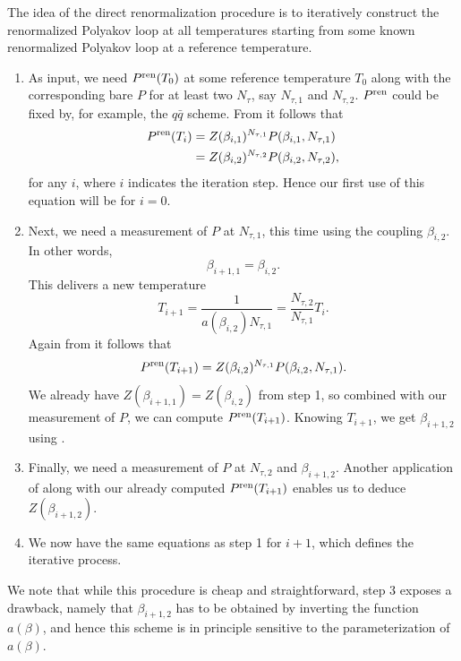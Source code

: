 The idea of the direct renormalization procedure is
to iteratively construct the renormalized Polyakov loop at all temperatures
starting from some known renormalized Polyakov loop at a reference temperature.
\begin{enumerate}
  \item As input, we need $P^{\rm ren}(T_0)$ at some reference temperature
  $T_0$ along with the corresponding bare $P$ for at least two $N_\tau$, 
  say $N_{\tau,1}$ and $N_{\tau,2}$. $P^{\rm ren}$ could be fixed by, for example, 
  the $q\bar{q}$ scheme. From  it follows that
  \begin{equation*}\begin{aligned}
  P^{\rm ren}(T_i)&=Z(\beta_{i,1})^{N_{\tau,1}}P(\beta_{i,1},N_{\tau,1})\\
            &=Z(\beta_{i,2})^{N_{\tau,2}}P(\beta_{i,2},N_{\tau,2}),
  \end{aligned}\end{equation*}
  for any $i$, where $i$ indicates the iteration step. Hence our first use
  of this equation will be for $i=0$.
  \item Next, we need a measurement of $P$ at $N_{\tau,1}$, this time using the
  coupling $\beta_{i,2}$. In other words,
  $$
  \beta_{i+1,1}=\beta_{i,2}.
  $$
  This delivers a new temperature
  $$
  T_{i+1}=\frac{1}{a(\beta_{i,2})N_{\tau,1}}=\frac{N_{\tau,2}}{N_{\tau,1}}T_i.
  $$
  Again from  it follows that
  $$
  P^{\rm ren}(T_{i+1})=Z(\beta_{i,2})^{N_{\tau,1}}P(\beta_{i,2},N_{\tau,1}).
  $$
  We already have $Z(\beta_{i+1,1})=Z(\beta_{i,2})$ from step 1, so combined with 
  our measurement of $P$, we can compute $P^{\rm ren}(T_{i+1})$. Knowing $T_{i+1}$, we get
  $\beta_{i+1,2}$ using . 
  \item Finally, we need a measurement of $P$ at $N_{\tau,2}$ and $\beta_{i+1,2}$.
  Another application of  along with our already
  computed $P^{\rm ren}(T_{i+1})$ enables us to deduce $Z(\beta_{i+1,2})$.
  \item We now have the same equations as step 1 for $i+1$, which defines
  the iterative process. 
\end{enumerate}

We note that while this procedure is cheap and straightforward, step 3 exposes
a drawback, namely that $\beta_{i+1,2}$ has to be obtained by inverting
the function $a(\beta)$, and hence this scheme is in principle sensitive to the
parameterization of $a(\beta)$. 

